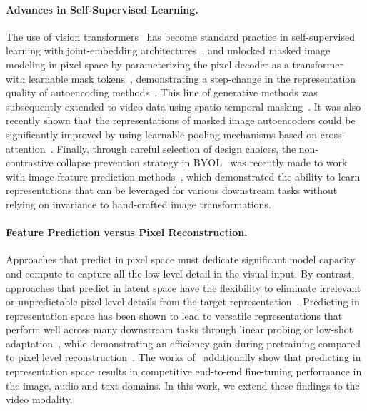 \documentclass[twocolumn]{fairmeta}
\theoremstyle{plain}
\theoremstyle{definition}
\theoremstyle{remark}
\begin{document}
\paragraph{\bf Advances in Self-Supervised Learning.}
The use of vision transformers~\citep{dosovitskiy2020image, li2022uniformer} has become standard practice in self-supervised learning with joint-embedding architectures~\citep{chen2021empirical,caron2021emerging,oquab2023dinov2,zhou2021ibotyes,assran2022masked}, and unlocked masked image modeling in pixel space by parameterizing the pixel decoder as a transformer with learnable mask tokens~\citep{dosovitskiy2020image, xie2021simmim, he2021masked, bao2021beit}, demonstrating a step-change in the representation quality of autoencoding methods~\citep{vincent2010stacked}.
This line of generative methods was subsequently extended to video data using spatio-temporal masking~\citep{tong2022videomae, feichtenhofer2022masked, wang2023videomae, kalluri2023flavr, gupta2023siamese}.
It was also recently shown that the representations of masked image autoencoders could be significantly improved by using learnable pooling mechanisms based on cross-attention~\citep{chen2022context}.
Finally, through careful selection of design choices, the non-contrastive collapse prevention strategy in BYOL~\citep{grill2020bootstrap} was recently made to work with image feature prediction methods~\citep{baevski2022data2vec, assran2023self}, which demonstrated the ability to learn representations that can be leveraged for various downstream tasks without relying on invariance to hand-crafted image transformations.

\paragraph{\bf Feature Prediction versus Pixel Reconstruction.}
Approaches that predict in pixel space must dedicate significant model capacity and compute to capture all the low-level detail in the visual input.
By contrast, approaches that predict in latent space have the flexibility to eliminate irrelevant or unpredictable pixel-level details from the target representation~\citep{vondrick2016anticipating}.
Predicting in representation space has been shown to lead to versatile representations that perform well across many downstream tasks through linear probing or low-shot adaptation~\citep{assran2023self,oquab2023dinov2,assran2022masked}, while demonstrating an efficiency gain during pretraining compared to pixel level reconstruction~\citep{assran2023self, baevski2022data2vec, baevski2022efficient}.
The works of~\citet{baevski2022efficient, baevski2022data2vec} additionally show that predicting in representation space results in competitive end-to-end fine-tuning performance in the image, audio and text domains.
In this work, we extend these findings to the video modality.
\end{document}
